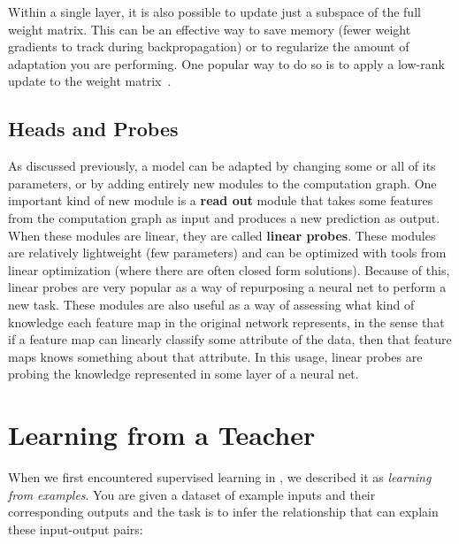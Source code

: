 Within a single layer, it is also possible to update just a subspace of the full weight matrix. This can be an effective way to save memory (fewer weight gradients to track during backpropagation) or to regularize the amount of adaptation you are performing. One popular way to do so is to apply a low-rank update to the weight matrix~\cite{hu2021lora}.

\subsection{Heads and Probes}
As discussed previously, a model can be adapted by changing some or all of its parameters, or by adding entirely new modules to the computation graph. One important kind of new module is a \textbf{read out} module that takes some features from the computation graph as input and produces a new prediction as output. When these modules are linear, they are called \textbf{linear probes}. These modules are relatively lightweight (few parameters) and can be optimized with tools from linear optimization (where there are often closed form solutions). Because of this, linear probes are very popular as a way of repurposing a neural net to perform a new task. These modules are also useful as a way of assessing what kind of knowledge each feature map in the original network represents, in the sense that if a feature map can linearly classify some attribute of the data, then that feature maps knows something about that attribute. In this usage, linear probes are probing the knowledge represented in some layer of a neural net.



\section{Learning from a Teacher}
When we first encountered supervised learning in \chap{\ref{chapter:intro_to_learning}}, we described it as \textit{learning from examples}. You are given a dataset of example inputs and their corresponding outputs and the task is to infer the relationship that can explain these input-output pairs:
\begin{center}
\end{center}

